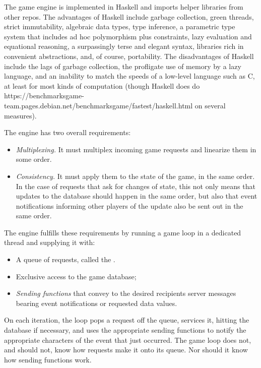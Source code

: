 The game engine is implemented in Haskell and imports helper libraries from
other repos.
The advantages of Haskell include
garbage collection, green threads, strict immutability, algebraic data types,
type inference, a parametric type system that includes ad hoc polymorphism plus
constraints, lazy evaluation and equational reasoning, a surpassingly terse
and elegant syntax, libraries rich in convenient abstractions, and, of course,
portability.
The disadvantages of Haskell include the lags of
garbage collection, the profligate use of memory by a lazy
language, and an inability to match the speeds of a low-level language such as
C, at least for most kinds of computation (though Haskell does do
{https://benchmarksgame-team.pages.debian.net/benchmarksgame/fastest/haskell.html}
on several measures).

The engine has two overall requirements:
\begin{itemize}
    \item {\em Multiplexing.} It must multiplex incoming game requests and
    linearize them in some order.
    \item {\em Consistency.} It must apply them to the state of the game,
    in the same order.
    In the case of requests that ask for changes of state, this not only
    means that updates to the database should happen in the same order,
    but also that event notifications informing other players of the
    update also be sent out in the same order.
\end{itemize}
The engine fulfills these requirements by running a game loop in a dedicated
thread and supplying it with:
\begin{itemize}
    \item A queue of requests, called the .
    \item Exclusive access to the game database;
    \item {\em Sending functions} that convey to the desired recipients
    server messages bearing event notifications or requested data values.
\end{itemize}
On each iteration, the loop pops a request off the queue, services it, hitting
the database if necessary, and uses the appropriate sending functions to notify
the appropriate characters of the event that just occurred.
The game loop does not, and should not, know how requests make it onto its
queue.
Nor should it know how sending functions work.

